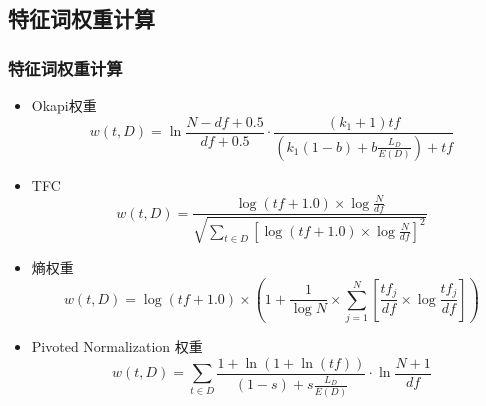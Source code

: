 \documentclass[CJKutf8, table, handout]{beamer}
\begin{document}
\begin{CJK}{UTF8}{gbsn}
\subsection{特征词权重计算}
\begin{frame}
  \frametitle{特征词权重计算}
  \begin{tiny}
    \begin{block}{}
      \begin{itemize}
        \item<1- | alert@1>{Okapi权重\cite{Robertson}
          $$
          w(t, D) = \ln \frac{N-df+0.5}{df + 0.5}\cdot
          \frac{(k_1 + 1) tf}{(k_1(1-b)+b\frac{L_D}{E(D)})+tf}
          $$}
        \item<2- | alert@2>{TFC
          $$
          w(t, D) = \frac{\log (tf + 1.0) \times \log \frac{N}{df}}{\sqrt{\sum_{t \in
          D}\left[\log (tf + 1.0) \times \log \frac{N}{df}\right]^2}}
          $$}
        \item<3- | alert@3>{熵权重
          $$
          w(t, D) = \log (tf + 1.0) \times \left (1 + \frac{1}{\log N} \times
          \sum_{j = 1}^N\left [\frac{tf_j}{df} \times \log
          \frac{tf_j}{df}\right]\right)
          $$}
        \item<4- | alert@4>{Pivoted Normalization 权重\cite{Singhal}
          $$
          w(t, D) = \sum_{t\in D} \frac{1 + \ln (1+ \ln(tf))}{(1-s)+s
          \frac{L_D}{E(D)}}\cdot \ln \frac{N+1}{df}
          $$}
        \end{itemize}
    \end{block}
  \end{tiny}
\end{frame}


\end{CJK}
\end{document}
